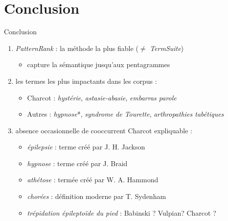 \documentclass[xcolor={table,usenames,dvipsnames}]{beamer}
\let\olditem\item
\renewcommand{\item}{%
\olditem\vspace{0pt}}
\begin{document}
\section[Conclusion]{Conclusion}
\begin{frame}{Conclusion}
	\begin{enumerate}

\item \textit{PatternRank} : la méthode la plus fiable ($\neq$ \textit{TermSuite})
\begin{itemize}
	\item capture la sémantique jusqu'aux pentagrammes
\end{itemize}
		\item 	les termes les plus impactants dans les corpus :
		\begin{itemize}
			\item Charcot : \textit{hystérie}, \textit{astasie-abasie}, \textit{embarras parole}
			\item Autres :  \textit{hypnose}*, \textit{syndrome de Tourette}, \textit{arthropathies tabétiques}
		\end{itemize}
				\item absence occasionnelle de cooccurrent Charcot expliquable :
		\begin{itemize}
			\item \textit{épilepsie} : terme créé par J. H. Jackson
			\item \textit{hypnose} : terme créé par J. Braid
			\item \textit{athétose} : termée créé par W. A. Hammond
			\item \textit{chorées} : définition moderne par T. Sydenham
			\item \textit{trépidation épileptoïde du pied} : Babinski ? Vulpian? Charcot ? 			
		\end{itemize}


\end{enumerate}
\end{frame}
\end{document}
